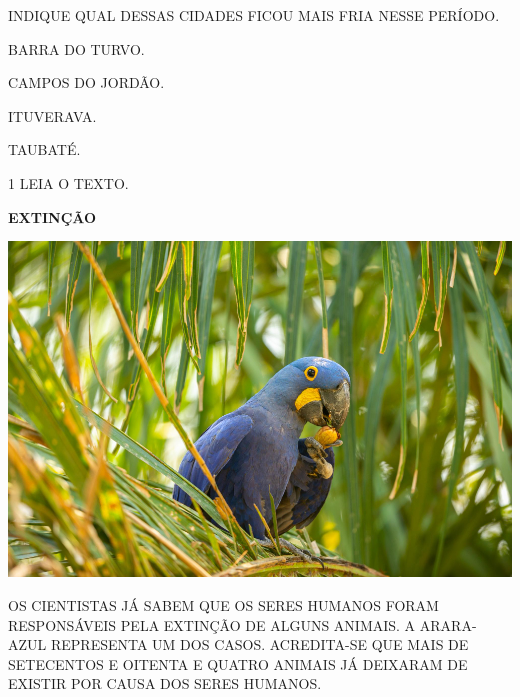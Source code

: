 INDIQUE QUAL DESSAS CIDADES FICOU MAIS FRIA NESSE PERÍODO.

\begin{escolha}
\item BARRA DO TURVO.

\item CAMPOS DO JORDÃO.

\item ITUVERAVA.

\item TAUBATÉ.
\end{escolha}

\pagebreak





\num{1} LEIA O TEXTO.

\begin{myquote}
\textbf{EXTINÇÃO}

\medskip

\begin{center}
\includegraphics[width=.9\textwidth]{media/image118.png}
\end{center}

\medskip

OS CIENTISTAS JÁ SABEM QUE OS SERES HUMANOS FORAM RESPONSÁVEIS PELA EXTINÇÃO DE ALGUNS ANIMAIS. A ARARA-AZUL REPRESENTA UM DOS CASOS. ACREDITA-SE QUE MAIS DE SETECENTOS E OITENTA E QUATRO ANIMAIS JÁ
DEIXARAM DE EXISTIR POR CAUSA DOS SERES HUMANOS.
\end{myquote}

